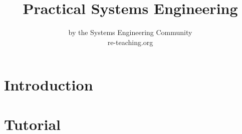 \documentclass[a4paper,twoside,10pt]{book}
\title{Practical Systems Engineering}
\author{by the Systems Engineering Community\\
re-teaching.org}
\begin{document}
        

\maketitle

\tableofcontents

\chapter{Introduction}


\chapter{Tutorial}


%
\end{document}
